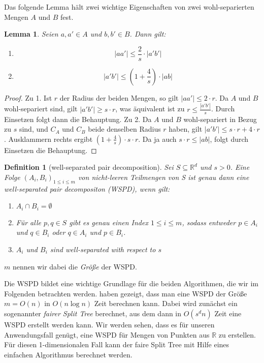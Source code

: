 \documentclass[11pt]{article}
\newcommand{\R}{\mathbb{R}}
\newtheorem{lemma}[theorem]{Lemma}
\newtheorem{definition}[theorem]{Definition}
\begin{document}
    Das folgende Lemma hält zwei wichtige Eigenschaften von zwei wohl-separierten Mengen $A$ und $B$ fest.
    \begin{lemma}
		Seien $a, a' \in A$ und $b, b' \in B$. Dann gilt:
		\begin{enumerate}[label={(\arabic*)}]
			\item \[|aa'| \leq \frac{2}{s}\cdot|a'b'|\]
			\item \[|a'b'| \leq (1+\frac{4}{s})\cdot|ab|\]
		\end{enumerate}
    \end{lemma}
    \begin{proof}
    	Zu 1. Ist $r$ der Radius der beiden Mengen, so gilt $|aa'| \leq 2 \cdot r$. Da $A$ und $B$ wohl-separiert sind, gilt $|a'b'| \geq s \cdot r$, was äquivalent ist zu $r \leq \frac{|a'b'|}{s}$. Durch Einsetzen folgt dann die Behauptung.
    	Zu 2. Da $A$ und $B$ wohl-separiert in Bezug zu $s$ sind, und $C_A$ und $C_B$ beide denselben Radius $r$ haben, gilt $|a'b'| \leq s \cdot r + 4 \cdot r$. Ausklammern rechts ergibt $(1 + \frac{4}{s}) \cdot s \cdot r$. Da ja auch $s \cdot r \leq |ab|$, folgt durch Einsetzen die Behauptung.
    \end{proof}
    
    \begin{definition}[well-separated pair decomposition]
    	\label{def:wspd}
    	Sei $S \subseteq \R^d$ und $s > 0$. Eine Folge $(A_i, B_i)_{1 \leq i \leq m}$ von nicht-leeren Teilmengen von S ist genau dann eine \emph{well-separated pair decompositon (WSPD)}, wenn gilt:
    	\begin{enumerate}[label={(\arabic*)}, itemsep=0mm]
    		\item $A_i \cap B_i = \emptyset$
    		\item Für alle $p, q \in S$ gibt es genau einen Index $1 \leq i \leq m$, sodass entweder $p \in A_i$ und $q \in B_i$ oder $q \in A_i$ und $p \in B_i$.
    		\item $A_i$ und $B_i$ sind well-separated with respect to $s$
    	\end{enumerate}
    \end{definition}
	
	\noindent	$m$ nennen wir dabei die \emph{Größe} der WSPD.

	Die WSPD bildet eine wichtige Grundlage für die beiden Algorithmen, die wir im Folgenden betrachten werden. \textellipsis haben gezeigt, dass man eine WSPD der Größe $m = O(n)$ in $O(n\log n)$ Zeit berechnen kann. Dabei wird zunächst ein sogenannter \emph{fairer Split Tree} berechnet, aus dem dann in $O(s^dn)$ Zeit eine WSPD erstellt werden kann. Wir werden sehen, dass es für unseren Anwendungsfall genügt, eine WSPD für Mengen von Punkten aus $\R$ zu erstellen. Für diesen 1-dimensionalen Fall kann der faire Split Tree mit Hilfe eines einfachen Algorithmus berechnet werden.
	
\end{document}
